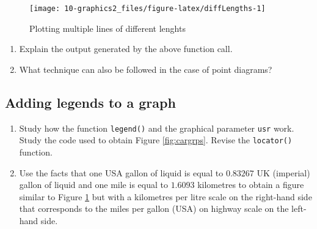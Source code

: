 \documentclass[
]{book}
\begin{document}
\begin{figure}
\texttt{[image: 10-graphics2\_files/figure-latex/diffLengths-1]} \caption{Plotting multiple lines of different lenghts}\label{fig:diffLengths}
\end{figure}

\begin{enumerate}
\def\labelenumi{(\alph{enumi})}
\item
  Explain the output generated by the above function call.
\item
  What technique can also be followed in the case of point diagrams?
\end{enumerate}

\subsection{Adding legends to a graph}\label{Legends}

\begin{enumerate}
\def\labelenumi{(\alph{enumi})}
\item
  Study how the function \texttt{legend()} and the graphical parameter \texttt{usr} work. Study the code used to obtain Figure \ref{fig:cargrps}. Revise the \texttt{locator()} function.
\item
  Use the facts that one USA gallon of liquid is equal to \(0.83267\) UK (imperial) gallon of liquid and one mile is equal to \(1.6093\) kilometres to obtain a figure similar to Figure \ref{fig:diffLengths} but with a kilometres per litre scale on the right-hand side that corresponds to the miles per gallon (USA) on highway scale on the left-hand side.
\end{enumerate}
\end{document}
